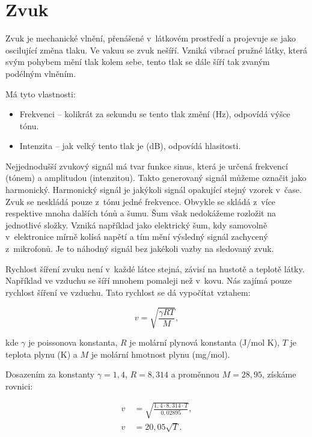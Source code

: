 \section{Zvuk}

Zvuk je mechanické vlnění, přenášené v~látkovém prostředí a projevuje se jako oscilující změna tlaku. Ve vakuu se zvuk nešíří. Vzniká vibrací pružné látky, která svým pohybem mění tlak kolem sebe, tento tlak se dále šíří tak zvaným podélným vlněním. \cite{zvuk}

Má tyto vlastnosti:
\begin{itemize}
\item Frekvenci – kolikrát za sekundu se tento tlak změní (Hz), odpovídá výšce tónu.
\item Intenzita – jak velký tento tlak je (dB), odpovídá hlasitosti.
\end{itemize}

Nejjednodušší zvukový signál má tvar funkce sinus, která je určená frekvencí (tónem) a amplitudou (intenzitou). Takto generovaný signál můžeme označit jako harmonický. Harmonický signál je jakýkoli signál opakující stejný vzorek v~čase. Zvuk se neskládá pouze z~tónu jedné frekvence. Obvykle se skládá z~více respektive mnoha dalších tónů a šumu. Šum však nedokážeme rozložit na jednotlivé složky. Vzniká například jako elektrický šum, kdy samovolně v~elektronice mírně kolísá napětí a tím mění výsledný signál zachycený z~mikrofonů. Je to náhodný signál bez jakékoli vazby na sledovaný zvuk.

Rychlost šíření zvuku není v~každé látce stejná, závisí na hustotě a teplotě látky. Například ve vzduchu se šíří mnohem pomaleji než v~kovu. Nás zajímá pouze rychlost šíření ve vzduchu. Tato rychlost se dá vypočítat vztahem:

\begin{equation}
	v=\sqrt{\frac{\gamma R T}{M}},
	\label{sireni_zvuku}
\end{equation}

kde $\gamma$ je poissonova konstanta, $R$ je molární plynová konstanta (J/mol K), $T$ je teplota plynu (K) a $M$ je molární hmotnost plynu (mg/mol). \cite{rychlost}

Dosazením za konstanty $\gamma = 1,4$, $R=8,314$ \cite{konstanty} a proměnnou $M=28,95$, získáme rovnici:

\begin{align}
	v~&= \sqrt{\frac{1,4\cdot 8,314\cdot T}{0,02895}}, \\
	v~&= 20,05 \sqrt{T}.
	\label{sireni_zvuku}
\end{align}

